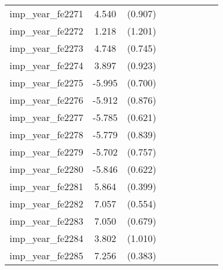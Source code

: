 {\begin{tabular}{l*{4}{cc}}
imp\_year\_fe2271&    4.540\sym{***}&  (0.907)&                  &         &                  &         &                  &         \\
imp\_year\_fe2272&    1.218         &  (1.201)&                  &         &                  &         &                  &         \\
imp\_year\_fe2273&    4.748\sym{***}&  (0.745)&                  &         &                  &         &                  &         \\
imp\_year\_fe2274&    3.897\sym{***}&  (0.923)&                  &         &                  &         &                  &         \\
imp\_year\_fe2275&   -5.995\sym{***}&  (0.700)&                  &         &                  &         &                  &         \\
imp\_year\_fe2276&   -5.912\sym{***}&  (0.876)&                  &         &                  &         &                  &         \\
imp\_year\_fe2277&   -5.785\sym{***}&  (0.621)&                  &         &                  &         &                  &         \\
imp\_year\_fe2278&   -5.779\sym{***}&  (0.839)&                  &         &                  &         &                  &         \\
imp\_year\_fe2279&   -5.702\sym{***}&  (0.757)&                  &         &                  &         &                  &         \\
imp\_year\_fe2280&   -5.846\sym{***}&  (0.622)&                  &         &                  &         &                  &         \\
imp\_year\_fe2281&    5.864\sym{***}&  (0.399)&                  &         &                  &         &                  &         \\
imp\_year\_fe2282&    7.057\sym{***}&  (0.554)&                  &         &                  &         &                  &         \\
imp\_year\_fe2283&    7.050\sym{***}&  (0.679)&                  &         &                  &         &                  &         \\
imp\_year\_fe2284&    3.802\sym{***}&  (1.010)&                  &         &                  &         &                  &         \\
imp\_year\_fe2285&    7.256\sym{***}&  (0.383)&                  &         &                  &         &                  &         \\

\end{tabular}}
